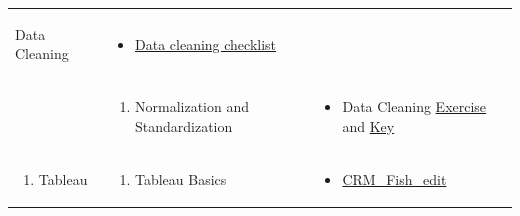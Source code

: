 \documentclass[
]{book}
\providecommand{\tightlist}{%
  \setlength{\itemsep}{0pt}\setlength{\parskip}{0pt}}
\begin{document}
\begin{longtable}[]{@{}lll@{}}
\begin{minipage}[t]{0.34\columnwidth}
\begin{enumerate}
  Data Cleaning
\end{enumerate}\strut
\end{minipage} & \begin{minipage}[t]{0.42\columnwidth}\raggedright
\begin{itemize}
\tightlist
\item
  \href{files/data_processing_checklist.docx}{Data cleaning checklist}
\end{itemize}\strut
\end{minipage}\tabularnewline
\begin{minipage}[t]{0.15\columnwidth}\raggedright
\strut
\end{minipage} & \begin{minipage}[t]{0.34\columnwidth}\raggedright
\begin{enumerate}
\def\labelenumi{\arabic{enumi}.}
\setcounter{enumi}{2}
\tightlist
\item
  Normalization and Standardization
\end{enumerate}\strut
\end{minipage} & \begin{minipage}[t]{0.42\columnwidth}\raggedright
\begin{itemize}
\tightlist
\item
  Data Cleaning \href{files/M2S3_exercise.xlsx}{Exercise} and \href{files/M2S3_exercise_key.xlsx}{Key}
\end{itemize}\strut
\end{minipage}\tabularnewline
\begin{minipage}[t]{0.15\columnwidth}\raggedright
\begin{enumerate}
\def\labelenumi{\arabic{enumi}.}
\setcounter{enumi}{2}
\tightlist
\item
  Tableau
\end{enumerate}\strut
\end{minipage} & \begin{minipage}[t]{0.34\columnwidth}\raggedright
\begin{enumerate}
\def\labelenumi{\arabic{enumi}.}
\tightlist
\item
  Tableau Basics
\end{enumerate}\strut
\end{minipage} & \begin{minipage}[t]{0.42\columnwidth}\raggedright
\begin{itemize}
\tightlist
\item
  \href{files/CRM_Fish_edit.xlsx}{CRM\_Fish\_edit}
\end{itemize}\strut

\end{minipage}
\end{longtable}
\end{document}
